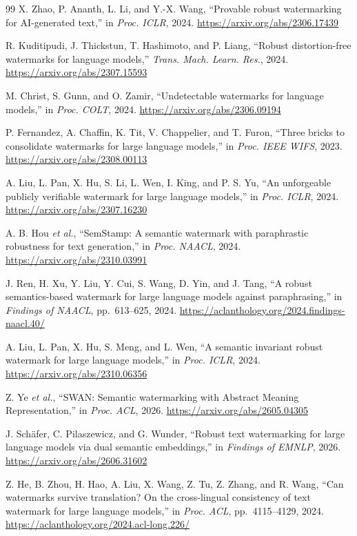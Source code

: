 \documentclass[journal]{IEEEtran}
\begin{document}
\begin{thebibliography}{99}
X. Zhao, P. Ananth, L. Li, and Y.-X. Wang, ``Provable robust watermarking for AI-generated text,'' in \emph{Proc. ICLR}, 2024. \url{https://arxiv.org/abs/2306.17439}

R. Kuditipudi, J. Thickstun, T. Hashimoto, and P. Liang, ``Robust distortion-free watermarks for language models,'' \emph{Trans. Mach. Learn. Res.}, 2024. \url{https://arxiv.org/abs/2307.15593}

M. Christ, S. Gunn, and O. Zamir, ``Undetectable watermarks for language models,'' in \emph{Proc. COLT}, 2024. \url{https://arxiv.org/abs/2306.09194}

P. Fernandez, A. Chaffin, K. Tit, V. Chappelier, and T. Furon, ``Three bricks to consolidate watermarks for large language models,'' in \emph{Proc. IEEE WIFS}, 2023. \url{https://arxiv.org/abs/2308.00113}

A. Liu, L. Pan, X. Hu, S. Li, L. Wen, I. King, and P. S. Yu, ``An unforgeable publicly verifiable watermark for large language models,'' in \emph{Proc. ICLR}, 2024. \url{https://arxiv.org/abs/2307.16230}

A. B. Hou \emph{et al.}, ``SemStamp: A semantic watermark with paraphrastic robustness for text generation,'' in \emph{Proc. NAACL}, 2024. \url{https://arxiv.org/abs/2310.03991}

J. Ren, H. Xu, Y. Liu, Y. Cui, S. Wang, D. Yin, and J. Tang, ``A robust semantics-based watermark for large language models against paraphrasing,'' in \emph{Findings of NAACL}, pp.~613--625, 2024. \url{https://aclanthology.org/2024.findings-naacl.40/}

A. Liu, L. Pan, X. Hu, S. Meng, and L. Wen, ``A semantic invariant robust watermark for large language models,'' in \emph{Proc. ICLR}, 2024. \url{https://arxiv.org/abs/2310.06356}

Z. Ye \emph{et al.}, ``SWAN: Semantic watermarking with Abstract Meaning Representation,'' in \emph{Proc. ACL}, 2026. \url{https://arxiv.org/abs/2605.04305}

J. Sch\"afer, C. Pilaszewicz, and G. Wunder, ``Robust text watermarking for large language models via dual semantic embeddings,'' in \emph{Findings of EMNLP}, 2026. \url{https://arxiv.org/abs/2606.31602}

Z. He, B. Zhou, H. Hao, A. Liu, X. Wang, Z. Tu, Z. Zhang, and R. Wang, ``Can watermarks survive translation? On the cross-lingual consistency of text watermark for large language models,'' in \emph{Proc. ACL}, pp.~4115--4129, 2024. \url{https://aclanthology.org/2024.acl-long.226/}


\end{thebibliography}
\end{document}
